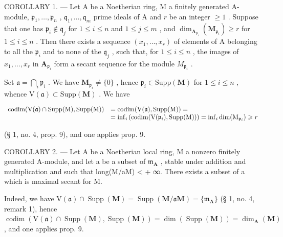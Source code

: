 COROLLARY 1. --- Let A be a Noetherian ring, M a finitely generated A-module, \(\mathfrak{p}_1, \ldots, \mathfrak{p}_n\) , \(\mathfrak{q}_1, \ldots, \mathfrak{q}_m\) prime ideals of A and \(r\) be an integer \(\geqslant 1\) . Suppose that one has \(\mathfrak{p}_i \notin \mathfrak{q}_j\) for \(1 \leqslant i \leqslant n\) and \(1 \leqslant j \leqslant m\) , and \(\dim_{\mathbf{A}_{\mathfrak{p}_i}} (\mathbf{M}_{\mathfrak{p}_i}) \geqslant r\) for \(1 \leqslant i \leqslant n\) . Then there exists a sequence \((x_1, \ldots, x_r)\) of elements of A belonging to all the \(\mathfrak{p}_i\) and to none of the \(\mathfrak{q}_j\) , such that, for \(1 \leqslant i \leqslant n\) , the images of \(x_1, \ldots, x_r\) in \(\mathbf{A}_{\mathfrak{p}_i}\) form a secant sequence for the module \(M_{\mathfrak{p}_i}\) .

Set \(\mathfrak{a} = \bigcap_{i}\mathfrak{p}_{i}\) . We have \(\mathbf{M}_{\mathfrak{p}_i}\neq \{0\}\) , hence \(\mathfrak{p}_i\in \mathrm{Supp}(\mathbf{M})\) for \(1\leqslant i\leqslant n\) , whence \(\mathrm{V}(\mathfrak{a})\subset \mathrm{Supp}(\mathbf{M})\) . We have

\[
\begin{array}{r l} \operatorname{codim} (\mathrm{V} (\mathfrak {a}) \cap \operatorname{Supp} (\mathrm{M}), \operatorname{Supp} (\mathrm{M})) & = \operatorname{codim} (\mathrm{V} (\mathfrak {a}), \operatorname{Supp} (\mathrm{M})) = \\ & = \inf _ {i} \left(\operatorname{codim} (\mathrm{V} (\mathfrak {p} _ {i}), \operatorname{Supp} (\mathrm{M}))\right) = \inf _ {i} \dim (\mathrm{M} _ {\mathfrak {p} _ {i}}) \geqslant r \end{array}
\]

(§ 1, no. 4, prop. 9), and one applies prop. 9.

COROLLARY 2. --- Let A be a Noetherian local ring, M a nonzero finitely generated A-module, and let a be a subset of \(\mathfrak{m}_{\mathbf{A}}\) , stable under addition and multiplication and such that long(M/aM) \textless{} + ∞. There exists a subset of a which is maximal secant for M.

Indeed, we have \(\mathrm{V}(\mathfrak{a}) \cap \operatorname{Supp}(\mathbf{M}) = \operatorname{Supp}(\mathbf{M}/\mathfrak{a}\mathbf{M}) = \{\mathfrak{m}_{\mathbf{A}}\}\) (§ 1, no. 4, remark 1), hence \(\operatorname{codim}(\mathrm{V}(\mathfrak{a}) \cap \operatorname{Supp}(\mathbf{M}), \operatorname{Supp}(\mathbf{M})) = \dim(\operatorname{Supp}(\mathbf{M})) = \dim_{\mathbf{A}}(\mathbf{M})\) , and one applies prop. 9.

